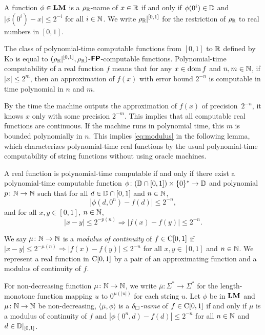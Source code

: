 \documentclass[envcountsame,orivec,oribibl]{llncs}
\begin{document}
A function $\phi \in \mathbf{LM}$ is a $\rho _\mathbb R$-name of $x \in \mathbb R$ 
if and only if $\phi(0^i) \in \mathbb D$ and $\lvert \phi(0^i) - x \rvert \le 2^{-i}$
for all $i \in \mathbb N$.
We write $\rho _\mathbb R|^{[0,1]}$ for the restriction of $\rho _\mathbb R$ to real numbers in $[0,1]$.

The class of polynomial-time computable functions from $[0,1]$ to $\mathbb R$ 
defined by Ko is equal to
$(\rho _\mathbb R|^{[0,1]},\rho _\mathbb R)$-$\text{\bfseries \sffamily \upshape FP}$-computable functions.
Polynomial-time computability of a real function $f$ means that
for any $x \in \mathop{\rm dom} f$ and $n,m \in \mathbb N$, 
if $|x| \le 2^m$, then
an approximation of $f(x)$ with error bound $2^{-n}$
is computable in time polynomial in $n$ and $m$.

By the time the machine outputs the approximation of $f (x)$ of precision~$2 ^{-n}$, 
it knows $x$ only with some precision $2 ^{-m}$.
This implies that all computable real functions are continuous.
If the machine runs in polynomial time,
this $m$ is bounded polynomially in $n$.
This implies \eqref{eq:modulus} in the following lemma, 
which characterizes polynomial-time real functions
by the usual polynomial-time computability of string functions 
without using oracle machines. 

\begin{lemma}
 \label{lem:type1representation}
 A real function is polynomial-time computable if and only if
 there exist a polynomial-time computable function 
 $\phi \colon (\mathbb D \cap [0, 1]) \times \{0\} ^* \to \mathbb D$ and 
 polynomial $p \colon \mathbb N \to \mathbb N$ such that
 for all $d \in \mathbb D \cap [0,1]$ and $n \in \mathbb N$,
 \begin{equation}
  |\phi(d, 0^n) - f(d)| \le 2^{-n},
 \end{equation}
 and for all $x, y \in [0, 1]$, $n \in \mathbb N$,
 \begin{equation} 
  |x-y| \le 2^{-p(n)} \Rightarrow |f(x) - f(y)| \le 2^{-n}.
   \label{eq:modulus}
 \end{equation}
\end{lemma}

We say $\mu \colon \mathbb N \to \mathbb N$ is a {\em modulus of continuity} of $f \in \mathrm C[0,1]$
if $|x - y| \le 2^{-\mu(n)} \Rightarrow |f(x) - f(y)| \le 2^{-n}$ for all $x, y \in [0,1]$ and $n \in \mathbb N$.
We represent a real function in $\mathrm C[0,1]$ by a pair of
an approximating function and a modulus of continuity of $f$.

For non-decreasing function $\mu \colon \mathbb N \to \mathbb N$, 
we write $\overline \mu \colon \Sigma^* \to \Sigma^*$ for the length-monotone
function mapping $u$ to $0^{\mu(|u|)}$ for each string $u$.
Let $\phi$ be in $\mathbf{LM}$ and $\mu \colon \mathbb N \to \mathbb N$ be non-decreasing,
$\langle \overline{\mu}, \phi \rangle$ is a {\em $\delta _\square$-name} of $f \in \mathrm C[0,1]$
if and only if $\mu$ is a modulus of continuity of $f$
and $|\phi(0^n, d) - f(d)| \le 2^{-n}$ for all $n \in \mathbb N$ and $d \in \mathbb D|_{[0,1]}$.
\end{document}

